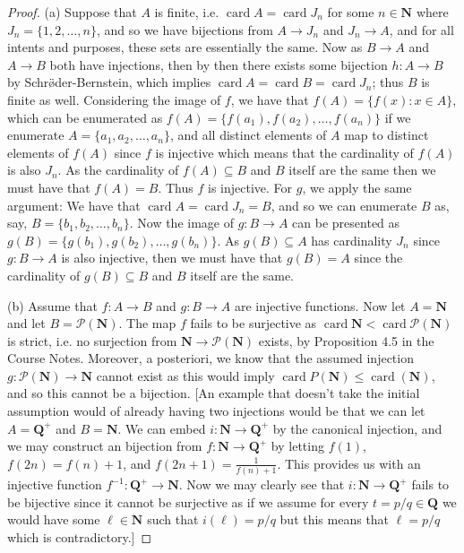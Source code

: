 \documentclass[9pt,reqno]{amsart}
\theoremstyle{definition}
\newcommand{\nn}{\mathbf N}
\newcommand{\qq}{\mathbf Q}
\DeclareMathOperator{\card}{card}
\begin{document}
\begin{proof}(a) Suppose that $A$ is finite, i.e. $\card A = \card J_n$ for some $n \in \nn$ where $J_n = \{ 1,2, \ldots, n \}$, and so we have bijections from $A \to J_n$ and $J_n \to A$, and for all intents and purposes, these sets are essentially the same. Now as $B \to A$ and $A \to B$ both have injections, then by then there exists some bijection $h \colon A \to B$ by Schr\o ̈der-Bernstein, which implies $\card A = \card B = \card J_n$; thus $B$ is finite as well. Considering the image of $f$, we have that $f(A) = \{f(x) \colon x \in A \}$, which can be enumerated as $f(A) = \{f(a_1), f( a_2), \ldots, f(a_n) \}$ if we enumerate $A = \{a_1, a_2, \ldots,  a_n \}$, and all distinct elements of $A$ map to distinct elements of $f(A)$ since $f$ is injective which means that the cardinality of $f(A)$ is also $J_n$. As the cardinality of $f(A) \subseteq B$ and $B$ itself are the same then we must have that $f(A) = B$. Thus $f$ is injective. For $g$, we apply the same argument: We have that $\card A = \card J_n = B$, and so we can enumerate $B$ as, say, $B = \{b_1, b_2, \ldots, b_n \}$. Now the image of $g \colon B \to A$ can be presented as $g(B) = \{g (b_1), g(b_2), \ldots, g(b_n) \}$. As $g(B) \subseteq A$ has cardinality $J_n$ since $g \colon B \to A$ is also injective, then we must have that $g(B) = A$ since the cardinality of $g(B)\subseteq B$ and $B$ itself are the same.

(b) Assume that $f \colon A \to B$ and $g\colon B \to A$ are injective functions. Now let $A = \nn $ and let $B = \mathcal P(\nn)$. The map $f$ fails to be surjective as $ \card \nn < \card \mathcal P(\nn)$ is strict, i.e. no surjection from $\nn \to \mathcal P(\nn)$ exists, by Proposition 4.5 in the Course Notes. Moreover, a posteriori, we know that the assumed injection $g  \colon \mathcal P(\nn) \to \nn$ cannot exist as this would imply $\card P(\nn ) \leq \card (\nn)$, and so this cannot be a bijection. [An example that doesn't take the initial assumption would of already having two injections would be that we can let $A = \qq^+$ and $B = \nn$. We can embed $i \colon \nn \to \qq^+$ by the canonical injection, and we may construct an bijection from $f \colon \nn \to \qq^+$ by letting $f(1)$, $f(2n) = f(n) + 1$, and $f(2n+1) = \frac{1}{f(n)+1}$. This provides us with an injective function $f^{-1} \colon \qq^+ \to \nn$. Now we may clearly see that $i \colon \nn \to \qq^+$ fails to be bijective since it cannot be surjective as if we assume for every $t = p/q \in \qq$ we would have some $\ell \in \nn$ such that $i(\ell) = p/q$ but this means that $\ell = p/q$ which is contradictory.]

\end{proof}
\end{document}
